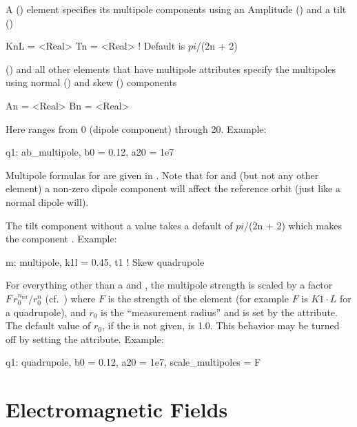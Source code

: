 A  () element specifies its multipole
components using an Amplitude () and a tilt ()
\begin{example}
  KnL = <Real>
  Tn  = <Real>  ! Default is $pi$/(2n + 2)
\end{example}
 () and all other elements that
have multipole attributes specify the multipoles using normal
() and skew () components 
\begin{example}
  An = <Real>
  Bn = <Real>
\end{example}
Here  ranges from 0
(dipole component) through 20. Example:
\begin{example}
  q1: ab_multipole, b0 = 0.12, a20 = 1e7
\end{example}

Multipole formulas for are given in .  Note that for
 and  (but not any other element) a
non-zero dipole component will affect the reference orbit (just like a
normal dipole will).

The  tilt component without a value takes a default of $pi$/(2n
+ 2) which makes the component .  Example:
\begin{example}
  m: multipole, k1l = 0.45, t1  ! Skew quadrupole
\end{example}

For everything other than a  and , the
multipole strength is scaled by a factor $F \, r_0^{n_\text{ref}} /
r_0^n$ (cf.~) where $F$ is the strength of the element (for
example $F$ is $K1 \cdot L$ for a quadrupole), and $r_0$ is the
``measurement radius'' and is set by the  attribute. The
default value of $r_0$, if the  is not given, is 1.0.  This
behavior may be turned off by setting the 
attribute.  Example:
\begin{example}
  q1: quadrupole, b0 = 0.12, a20 = 1e7, scale_multipoles = F
\end{example}

\section{Electromagnetic Fields}
\label{s:em.fields}


